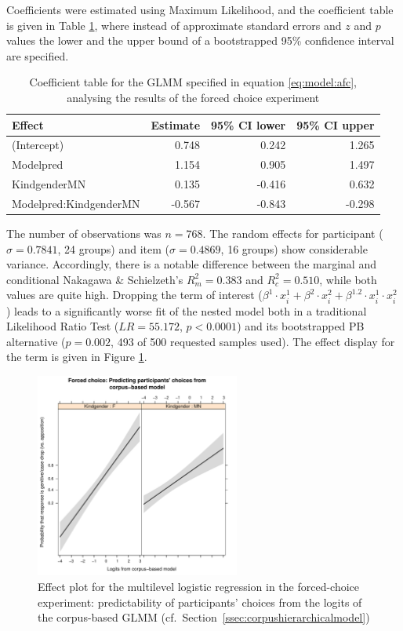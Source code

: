 \documentclass[USenglish]{article}
\begin{document}
Coefficients were estimated using Maximum Likelihood, and the coefficient table is given in Table \ref{tab:afc:model}, where instead of approximate standard errors and $z$ and $p$ values the lower and the upper bound of a bootstrapped 95\% confidence interval are specified.

\begin{table}
  \centering
  \begin{tabular}{lrrr}
    Effect & Estimate & 95\% CI lower & 95\% CI upper \\
    \midrule
    (Intercept)            &  0.748  &  0.242  &  1.265 \\
    Modelpred              &  1.154  &  0.905  &  1.497 \\
    KindgenderMN           &  0.135  & -0.416  &  0.632 \\
    Modelpred:KindgenderMN & -0.567  & -0.843  & -0.298 \\
  \end{tabular}
  \caption{Coefficient table for the GLMM specified in equation \ref{eq:model:afc}, analysing the results of the forced choice experiment}
  \label{tab:afc:model}
\end{table}

The number of observations was $n=768$.
The random effects for participant ($\sigma=0.7841$, 24 groups) and item ($\sigma=0.4869$, 16 groups) show considerable variance.
Accordingly, there is a notable difference between the marginal and conditional Nakagawa \& Schielzeth's $R^2_{m}=0.383$ and $R^2_{c}=0.510$, while both values are quite high.
Dropping the term of interest ($\beta^1\cdot x_i^1+\beta^2\cdot x_i^2+\beta^{1.2}\cdot x_i^1\cdot x_i^2$) leads to a significantly worse fit of the nested model both in a traditional Likelihood Ratio Test ($LR=55.172$, $p<0.0001$) and its bootstrapped PB alternative ($p = 0.002$, 493 of 500 requested samples used).
The effect display for the term is given in Figure \ref{fig:afc:effects}.

\begin{figure}[h]
\centering
\includegraphics[width=0.6\textwidth]{figures/experiment/2afc_effects}
\caption{Effect plot for the multilevel logistic regression in the forced-choice experiment: predictability of participants' choices from the logits of the corpus-based GLMM (cf.\ Section~\ref{ssec:corpushierarchicalmodel})}
\label{fig:afc:effects}
\end{figure}
\end{document}
